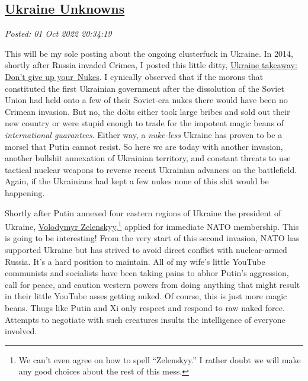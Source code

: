 %

\subsection*{\href{https://analyzethedatanotthedrivel.org/2022/10/01/ukraine-unknowns/}{Ukraine Unknowns}}


\noindent\emph{Posted: 01 Oct 2022 20:34:19}
\vspace{6pt}

This will be my sole posting about the ongoing clusterfuck in Ukraine.
In 2014, shortly after Russia invaded Crimea, I posted this little
ditty,
\href{https://analyzethedatanotthedrivel.org/2014/04/18/ukraine-takeaway-dont-give-up-your-nukes/}{\uline{Ukraine
takeaway: Don't give up your~Nukes}}. I cynically observed that if the
morons that constituted the first Ukrainian government after the
dissolution of the Soviet Union had held onto a few of their Soviet-era
nukes there would have been no Crimean invasion. But no, the dolts
either took large bribes and sold out their new country or were stupid
enough to trade for the impotent magic beans of \emph{international
guarantees}. Either way, a \emph{nuke-less} Ukraine has proven to be a
morsel that Putin cannot resist. So here we are today with another
invasion, another bullshit annexation of Ukrainian territory, and
constant threats to use tactical nuclear weapons to reverse recent
Ukrainian advances on the battlefield. Again, if the Ukrainians had kept
a few nukes none of this shit would be happening.

Shortly after Putin annexed four eastern regions of Ukraine the
president of Ukraine,
\href{https://www.cnn.com/2022/03/17/politics/how-to-spell-volodymyr-zelenskyy/index.html}{Volodymyr
Zelenskyy,}\footnote{We can't even agree on how to spell ``Zelenskyy.'' I rather doubt we
  will make any good choices about the rest of this
  mess.} applied for immediate NATO membership. This is going to be interesting!
From the very start of this second invasion, NATO has supported Ukraine
but has strived to avoid direct conflict with nuclear-armed Russia. It's
a hard position to maintain. All of my wife's little YouTube communists
and socialists have been taking pains to abhor Putin's aggression, call
for peace, and caution western powers from doing anything that might
result in their little YouTube asses getting nuked. Of course, this is
just more magic beans. Thugs like Putin and Xi only respect and respond
to raw naked force. Attempts to negotiate with such creatures insults
the intelligence of everyone involved.

